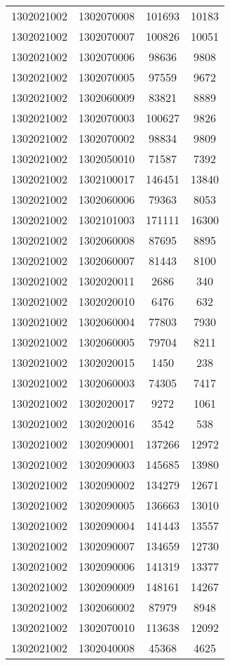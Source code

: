 \begin{longtable}[h]{llcc}
		1302021002 & 1302070008 & 101693 & 10183\\
		1302021002 & 1302070007 & 100826 & 10051\\
		1302021002 & 1302070006 & 98636 & 9808\\
		1302021002 & 1302070005 & 97559 & 9672\\
		1302021002 & 1302060009 & 83821 & 8889\\
		1302021002 & 1302070003 & 100627 & 9826\\
		1302021002 & 1302070002 & 98834 & 9809\\
		1302021002 & 1302050010 & 71587 & 7392\\
		1302021002 & 1302100017 & 146451 & 13840\\
		1302021002 & 1302060006 & 79363 & 8053\\
		1302021002 & 1302101003 & 171111 & 16300\\
		1302021002 & 1302060008 & 87695 & 8895\\
		1302021002 & 1302060007 & 81443 & 8100\\
		1302021002 & 1302020011 & 2686 & 340\\
		1302021002 & 1302020010 & 6476 & 632\\
		1302021002 & 1302060004 & 77803 & 7930\\
		1302021002 & 1302060005 & 79704 & 8211\\
		1302021002 & 1302020015 & 1450 & 238\\
		1302021002 & 1302060003 & 74305 & 7417\\
		1302021002 & 1302020017 & 9272 & 1061\\
		1302021002 & 1302020016 & 3542 & 538\\
		1302021002 & 1302090001 & 137266 & 12972\\
		1302021002 & 1302090003 & 145685 & 13980\\
		1302021002 & 1302090002 & 134279 & 12671\\
		1302021002 & 1302090005 & 136663 & 13010\\
		1302021002 & 1302090004 & 141443 & 13557\\
		1302021002 & 1302090007 & 134659 & 12730\\
		1302021002 & 1302090006 & 141319 & 13377\\
		1302021002 & 1302090009 & 148161 & 14267\\
		1302021002 & 1302060002 & 87979 & 8948\\
		1302021002 & 1302070010 & 113638 & 12092\\
		1302021002 & 1302040008 & 45368 & 4625\\

\end{longtable}
